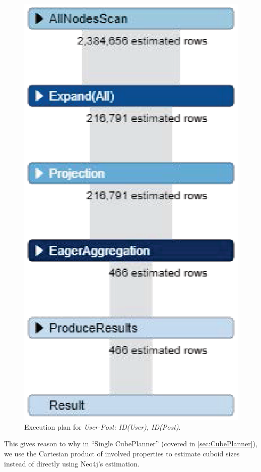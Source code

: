 \begin{figure}
	\centering
	\includegraphics[scale=0.7]{pic/wrong2.eps}
	\caption{Execution plan for \textit{User-Post: ID(User), ID(Post)}.}
	\label{fig:wrong2}
\end{figure}

This gives reason to why in ``Single CubePlanner'' (covered in \ref{sec:CubePlanner}), we use the Cartesian product of involved properties to estimate cuboid sizes instead of directly using Neo4j's estimation.
